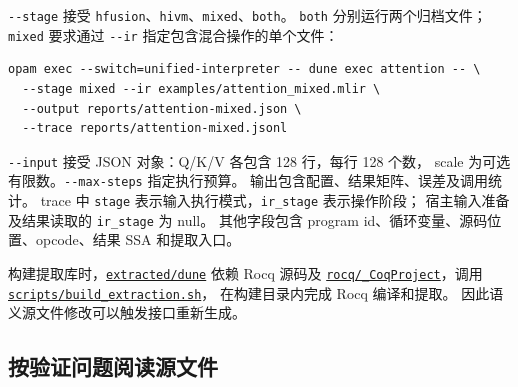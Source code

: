 \documentclass[UTF8,a4paper,11pt,fontset=fandol]{ctexart}
\newcommand{\code}{\nolinkurl}
\newcommand{\src}[1]{\href{run:../#1}{\nolinkurl{#1}}}
\begin{document}
{{{{{{{{\code{--stage} 接受 \code{hfusion}、\code{hivm}、\code{mixed}、\code{both}。
\code{both} 分别运行两个归档文件；\code{mixed} 要求通过
\code{--ir} 指定包含混合操作的单个文件：
\begin{lstlisting}
opam exec --switch=unified-interpreter -- dune exec attention -- \
  --stage mixed --ir examples/attention_mixed.mlir \
  --output reports/attention-mixed.json \
  --trace reports/attention-mixed.jsonl
\end{lstlisting}
\code{--input} 接受 JSON 对象：Q/K/V 各包含 128 行，每行 128 个数，
scale 为可选有限数。\code{--max-steps} 指定执行预算。
输出包含配置、结果矩阵、误差及调用统计。
trace 中 \code{stage} 表示输入执行模式，\code{ir_stage} 表示操作阶段；
宿主输入准备及结果读取的 \code{ir_stage} 为 null。
其他字段包含 program id、循环变量、源码位置、opcode、结果 SSA 和提取入口。

构建提取库时，\src{extracted/dune} 依赖 Rocq 源码及
\src{rocq/_CoqProject}，调用 \src{scripts/build_extraction.sh}，
在构建目录内完成 Rocq 编译和提取。
因此语义源文件修改可以触发接口重新生成。

\subsection{按验证问题阅读源文件}

}}}}}}}}
\end{document}
